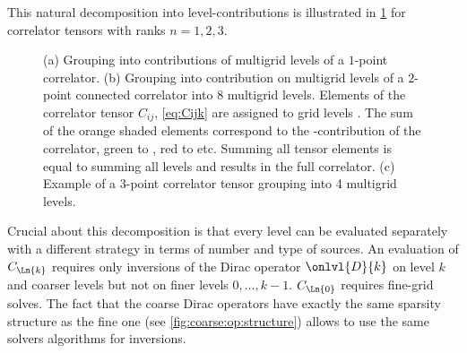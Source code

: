 This natural decomposition into level-contributions is illustrated in \cref{fig:mg:corr} for correlator tensors with ranks $n=1,2,3$.
% 
\begin{figure}
\centering
{}
% 
% 
% 
\caption{(a) Grouping into contributions of multigrid levels of a $1$-point correlator. (b) Grouping into contribution on multigrid levels of a $2$-point connected correlator into \num{8} multigrid levels. Elements of the correlator tensor $C_{ij}$, \cref{eq:Cijk} are assigned to grid levels . The sum of the orange shaded elements correspond to the -contribution of the correlator, green to , red to  etc. Summing all tensor elements is equal to summing all levels and results in the full correlator. (c) Example of a $3$-point correlator tensor grouping into \num{4} multigrid levels. \takenpart }
\label{fig:mg:corr}
\end{figure}
Crucial about this decomposition is that every level can be evaluated separately with a different strategy in terms of number and type of sources.
An evaluation of $C_{\Ln{k}}$ requires only inversions of the Dirac operator $\onlvl{D}{k}$ on level $k$ and coarser levels but not on finer levels $0, \ldots, k-1$.
$C_{\Ln{0}}$ requires fine-grid solves.
The fact that the coarse Dirac operators have exactly the same sparsity structure as the fine one (see \cref{fig:coarse:op:structure}) allows to use the same solvers algorithms for inversions.

